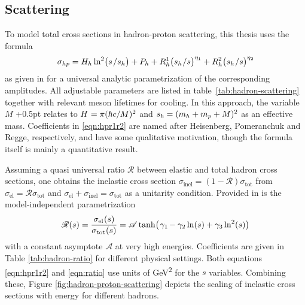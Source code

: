\begin{spacing}{0.975}
	
	
	\subsection{Scattering}
	\label{sub:scattering}
	
	\enlargethispage*{2\baselineskip}

	To model total cross sections in hadron-proton scattering, this thesis uses the formula
	\begin{equation}
		\sigma_{hp} = H_h \ln^2 \bigl( s \kern+1.0pt / s_h \bigr) + P_h +
		R_h^1 \bigl( s_h \kern+0.5pt / s \bigr)^{\eta_1} + R_h^2 \bigl( s_h \kern+0.5pt / s \bigr)^{\eta_2}
		\label{eqn:hpr1r2}
	\end{equation}
	as given in \cite{Belousov_2016} for a universal analytic parametrization of the corresponding amplitudes.
	All adjustable parameters are listed in table~\ref{tab:hadron-scattering} together with relevant meson lifetimes for
	cooling. In this approach, the variable $M$ \kern+0.5pt relates to $H \kern+0.5pt = \pi (\hbar c / M)^2$ and
	$s_h \kern-0.5pt = (m_h + m_p + M)^2$ as an effective mass. Coefficients in \eqref{eqn:hpr1r2} are named after Heisenberg,
	Pomeranchuk and Regge, respectively, and have some qualitative motivation, though the formula itself is mainly a quantitative
	result.
	\newpage
\end{spacing}



Assuming a quasi universal ratio $\mathscr{R}$ between elastic and total hadron cross sections, one obtains the inelastic
cross section $\sigma_\text{inel} = (1 - \mathscr{R}) \sigma_\text{tot}$ from $\sigma_\text{el} = \mathscr{R} \sigma_\text{tot}$
and $\sigma_\text{el} + \sigma_\text{inel} = \sigma_\text{tot}$ as a unitarity condition. Provided in \cite{Fagundes_2012} is
the model-independent parametrization
\begin{equation}
	\mathscr{R}(s) = \frac{\sigma_{\text{el}\kern+0.5pt} (s)}{\sigma_{\text{tot}\kern+0.5pt} (s)} =
	\mathscr{A} \tanh \bigl( \kern+1.0pt \gamma_1 \kern-1.0pt - \gamma_2 \ln (s) + \gamma_3 \ln^2 (s) \bigr)
	\label{eqn:ratio}
\end{equation}
with a constant asymptote $\mathscr{A}$ at very high energies. Coefficients are given in Table \ref{tab:hadron-ratio} for
different physical settings. Both equations \eqref{eqn:hpr1r2} and \eqref{eqn:ratio} use units of \unit{\giga\electronvolt\squared}
for the $s$  variables. Combining these, Figure \ref{fig:hadron-proton-scattering} depicts the scaling of inelastic cross sections
with energy for different hadrons.

